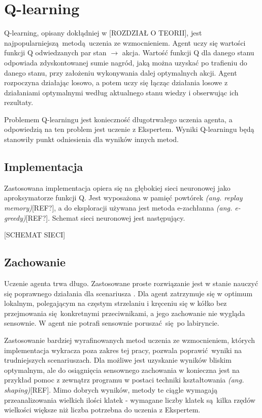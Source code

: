 \section{Q-learning}\label{q_learning}
Q-learning, opisany dokłądniej w [ROZDZIAŁ O TEORII],  jest najpopularniejszą metodą uczenia ze wzmocnieniem. Agent uczy się wartości funkcji Q odwiedzanych par stan $\to$ akcja. Wartość funkcji Q dla danego stanu odpowiada zdyskontowanej sumie nagród, jaką można uzyskać po trafieniu do danego stanu, przy założeniu wykonywania dalej optymalnych akcji. Agent rozpoczyna działając losowo, a potem uczy się łącząc działania losowe z działaniami optymalnymi według aktualnego stanu wiedzy i obserwując ich rezultaty.

Problemem Q-learningu jest konieczność długotrwałego uczenia agenta, a odpowiedzią na ten problem jest uczenie z Ekspertem. Wyniki Q-learningu będą stanowiły punkt odniesienia dla wyników innych metod.

\subsection{Implementacja}

Zastosowana implementacja opiera się na głębokiej sieci neuronowej jako aproksymatorze funkcji Q. Jest wyposażona w pamięć powtórek \textit{(ang. replay memory)}[REF?], a do eksploracji używana jest metoda e-zachłanna \textit{(ang. e-greedy)}[REF?]. Schemat sieci neuronowej jest następujący.

[SCHEMAT SIECI]


\subsection{Zachowanie}
Uczenie agenta trwa długo. Zastosowane proste rozwiązanie jest w stanie nauczyć się poprawnego działania dla scenariusza . Dla  agent zatrzymuje się w optimum lokalnym, polegającym na częstym strzelaniu i kręceniu się w kółko bez przejmowania się konkretnymi przeciwnikami, a jego zachowanie nie wygląda sensownie. W  agent nie potrafi sensownie poruszać się po labiryncie.

Zastosowanie bardziej wyrafinowanych metod uczenia ze wzmocnieniem, których implementacja wykracza poza zakres tej pracy, pozwala poprawić wyniki na trudniejszych scenariuszach. Dla  możliwe jest uzyskanie wyników bliskim optymalnym, ale do osiągnięcia sensownego zachowania w  konieczna jest na przykład pomoc z zewnątrz programu w postaci techniki kształtowania \textit{(ang. shaping)}[REF]. Mimo dobrych wyników, metody te ciągle wymagają przeanalizowania wielkich ilości klatek - wymagane liczby klatek są kilka rzędów wielkości większe niż liczba potrzebna do uczenia z Ekspertem.


